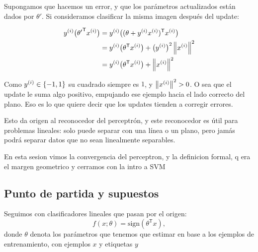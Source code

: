 \documentclass[11pt,letterpaper]{article}
\begin{document}
Supongamos que hacemos un error, y que los parámetros actualizados
están dados por $\theta'$. Si consideramos clasificar la misma imagen
después del update:

\begin{align*}
    y^{(i)} \big({\theta'}^{\mathsf{T}} x^{(i)}\big)
      &= y^{(i)} \big(
         (\theta + y^{(i)} x^{(i)})^{\mathsf{T}} x^{(i)} \big) \\
      &= y^{(i)} \big(\theta^{\mathsf{T}} x^{(i)}\big)
         + \big(y^{(i)}\big)^{2} \left\lVert x^{(i)} \right\rVert^{2} \\
      &= y^{(i)} \big(\theta^{\mathsf{T}} x^{(i)}\big)
         + \left\lVert x^{(i)} \right\rVert^{2}
\end{align*}

Como $y^{(i)} \in \left\{ -1, 1 \right\}$ su cuadrado siempre es $1$, y
$\left\lVert x^{(i)} \right\rVert^{2} > 0$. O sea que el update le suma algo positivo,
empujando ese ejemplo hacia el lado correcto del plano. Eso es lo que
quiere decir que los updates tienden a corregir errores.

\begin{ojo}
  Esto da origen al reconocedor del perceptrón, y este reconocedor es
  útil para problemas lineales: solo puede separar con una línea o un
  plano, pero jamás podrá separar datos que no sean linealmente
  separables.
\end{ojo}

\newpage



\begin{quick_sum}
    En esta sesion vimos la convergencia del perceptron, y la definicion
    formal, q era el margen geometrico y cerramos con la intro a SVM
\end{quick_sum}

\subsection*{Punto de partida y supuestos}

Seguimos con clasificadores lineales que pasan por el origen:
\[
    f(x; \theta) = \mathrm{sign}(\theta^{\mathsf{T}} x) ,
\]
donde $\theta$ denota los parámetros que tenemos que estimar en base a
los ejemplos de entrenamiento, con ejemplos $x$ y etiquetas $y$
\end{document}
